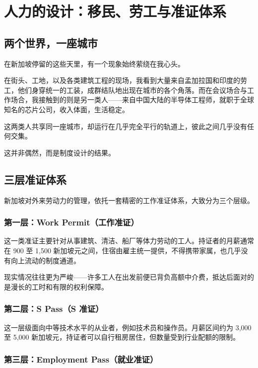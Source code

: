 \chapter{人力的设计：移民、劳工与准证体系}

\section{两个世界，一座城市}

在新加坡停留的这些天里，有一个现象始终萦绕在我心头。

在街头、工地，以及各类建筑工程的现场，我看到大量来自孟加拉国和印度的劳工，他们身穿统一的工装，成群结队地出现在城市的各个角落。而在会议场合与工作场合，我接触到的则是另一类人——来自中国大陆的半导体工程师，就职于全球知名的芯片公司，收入体面，生活稳定。

这两类人共享同一座城市，却运行在几乎完全平行的轨道上，彼此之间几乎没有任何交集。

这并非偶然，而是制度设计的结果。

\section{三层准证体系}

新加坡对外来劳动力的管理，依托一套精密的工作准证体系，大致分为三个层级。

\subsection*{第一层：Work Permit（工作准证）}

这一类准证主要针对从事建筑、清洁、船厂等体力劳动的工人。持证者的月薪通常在 900 至 1,500 新加坡元之间，住宿由雇主统一提供，不得携带家属，也几乎没有向上流动的制度通道。

现实情况往往更为严峻——许多工人在出发前便已背负高额中介费，抵达后面对的是漫长的工时和有限的权利保障。

\subsection*{第二层：S Pass（S 准证）}

这一层级面向中等技术水平的从业者，例如技术员和操作员。月薪区间约为 3,000 至 5,000 新加坡元，持证者可以自行租房居住，但数量受到行业配额的限制。

\subsection*{第三层：Employment Pass（就业准证）}

